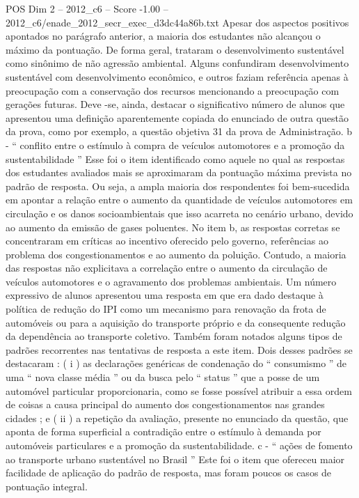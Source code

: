 \begin{textsample}{POS Dim 2 – 2012\_c6 – Score -1.00 – 2012\_c6/enade\_2012\_secr\_exec\_d3dc44a86b.txt}
Apesar dos aspectos positivos apontados no parágrafo anterior, a maioria dos estudantes não alcançou o máximo da pontuação.
De forma geral, trataram o desenvolvimento sustentável como sinônimo de não agressão ambiental.
Alguns confundiram desenvolvimento sustentável com desenvolvimento econômico, e outros faziam referência apenas à preocupação com a conservação dos recursos mencionando a preocupação com gerações futuras.
Deve -se, ainda, destacar o significativo número de alunos que apresentou uma definição aparentemente copiada do enunciado de outra questão da prova, como por exemplo, a questão objetiva 31 da prova de Administração. b - “ conflito entre o estímulo à compra de veículos automotores e a promoção da sustentabilidade ” Esse foi o item identificado como aquele no qual as respostas dos estudantes avaliados mais se aproximaram da pontuação máxima prevista no padrão de resposta.
Ou seja, a ampla maioria dos respondentes foi bem-sucedida em apontar a relação entre o aumento da quantidade de veículos automotores em circulação e os danos socioambientais que isso acarreta no cenário urbano, devido ao aumento da emissão de gases poluentes.
No item b, as respostas corretas se concentraram em críticas ao incentivo oferecido pelo governo, referências ao problema dos congestionamentos e ao aumento da poluição.
Contudo, a maioria das respostas não explicitava a correlação entre o aumento da circulação de veículos automotores e o agravamento dos problemas ambientais.
Um número expressivo de alunos apresentou uma resposta em que era dado destaque à política de redução do IPI como um mecanismo para renovação da frota de automóveis ou para a aquisição do transporte próprio e da consequente redução da dependência ao transporte coletivo.
Também foram notados alguns tipos de padrões recorrentes nas tentativas de resposta a este item.
Dois desses padrões se destacaram : ( i ) as declarações genéricas de condenação do “ consumismo ” de uma “ nova classe média ” ou da busca pelo “ status ” que a posse de um automóvel particular proporcionaria, como se fosse possível atribuir a essa ordem de coisas a causa principal do aumento dos congestionamentos nas grandes cidades ; e ( ii ) a repetição da avaliação, presente no enunciado da questão, que aponta de forma superficial a contradição entre o estímulo à demanda por automóveis particulares e a promoção da sustentabilidade. c - “ ações de fomento ao transporte urbano sustentável no Brasil ” Este foi o item que ofereceu maior facilidade de aplicação do padrão de resposta, mas foram poucos os casos de pontuação integral.

\end{textsample}
